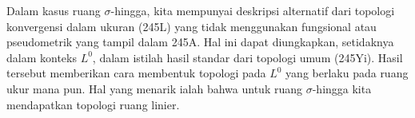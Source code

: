 {Dalam kasus ruang $\sigma$-hingga, kita mempunyai deskripsi alternatif dari
topologi konvergensi dalam ukuran (245L) yang tidak menggunakan fungsional
atau pseudometrik yang tampil dalam 245A. Hal ini dapat diungkapkan, setidaknya
dalam konteks $L^0$, dalam istilah hasil standar dari topologi umum (245Yi).
Hasil tersebut memberikan cara membentuk topologi pada
$L^0$ yang berlaku pada ruang ukur mana pun. Hal yang menarik ialah bahwa
untuk ruang $\sigma$-hingga kita mendapatkan topologi ruang linier.
}%


\discrpage

